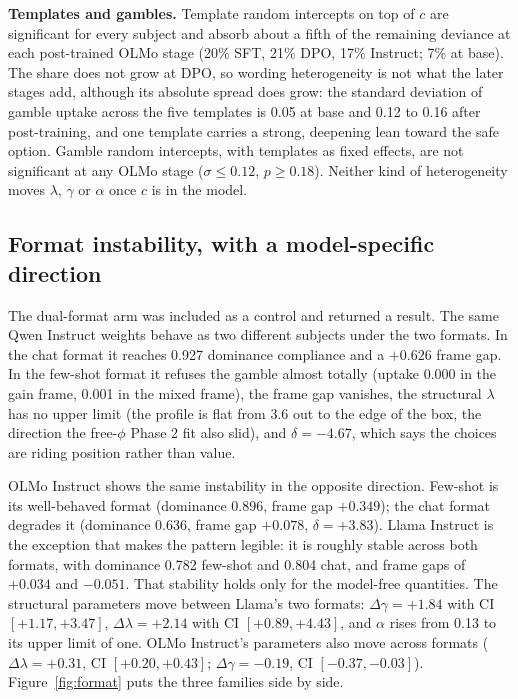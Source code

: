 \documentclass[11pt]{article}
\begin{document}
\textbf{Templates and gambles.} Template random intercepts on top of $c$ are significant for every
subject and absorb about a fifth of the remaining deviance at each post-trained OLMo stage (20\% SFT,
21\% DPO, 17\% Instruct; 7\% at base). The share does not grow at DPO, so wording heterogeneity is not
what the later stages add, although its absolute spread does grow: the standard deviation of gamble
uptake across the five templates is 0.05 at base and 0.12 to 0.16 after post-training, and one template
carries a strong, deepening lean toward the safe option. Gamble random intercepts, with templates as
fixed effects, are not significant at any OLMo stage ($\sigma \le 0.12$, $p \ge 0.18$). Neither kind of
heterogeneity moves $\lambda$, $\gamma$ or $\alpha$ once $c$ is in the model.

\subsection{Format instability, with a model-specific direction}
The dual-format arm was included as a control and returned a result. The same Qwen Instruct weights
behave as two different subjects under the two formats. In the chat format it reaches 0.927 dominance
compliance and a $+0.626$ frame gap. In the few-shot format it refuses the gamble almost totally (uptake
0.000 in the gain frame, 0.001 in the mixed frame), the frame gap vanishes, the structural $\lambda$
has no upper limit (the profile is flat from 3.6 out to the edge of the box, the direction the
free-$\phi$ Phase 2 fit also slid), and $\delta = -4.67$, which says the choices are riding position
rather than value.

OLMo Instruct shows the same instability in the opposite direction. Few-shot is its well-behaved format
(dominance 0.896, frame gap $+0.349$); the chat format degrades it (dominance 0.636, frame gap $+0.078$,
$\delta = +3.83$). Llama Instruct is the exception that makes the pattern legible: it is roughly stable
across both formats, with dominance 0.782 few-shot and 0.804 chat, and frame gaps of $+0.034$ and
$-0.051$. That stability holds only for the model-free quantities. The structural parameters move
between Llama's two formats: $\Delta\gamma = +1.84$ with CI $[+1.17, +3.47]$, $\Delta\lambda = +2.14$ with
CI $[+0.89, +4.43]$, and $\alpha$ rises from 0.13 to its upper limit of one. OLMo Instruct's parameters
also move across formats ($\Delta\lambda = +0.31$, CI $[+0.20, +0.43]$; $\Delta\gamma = -0.19$, CI
$[-0.37, -0.03]$). Figure~\ref{fig:format} puts the three families side by side.
\end{document}

